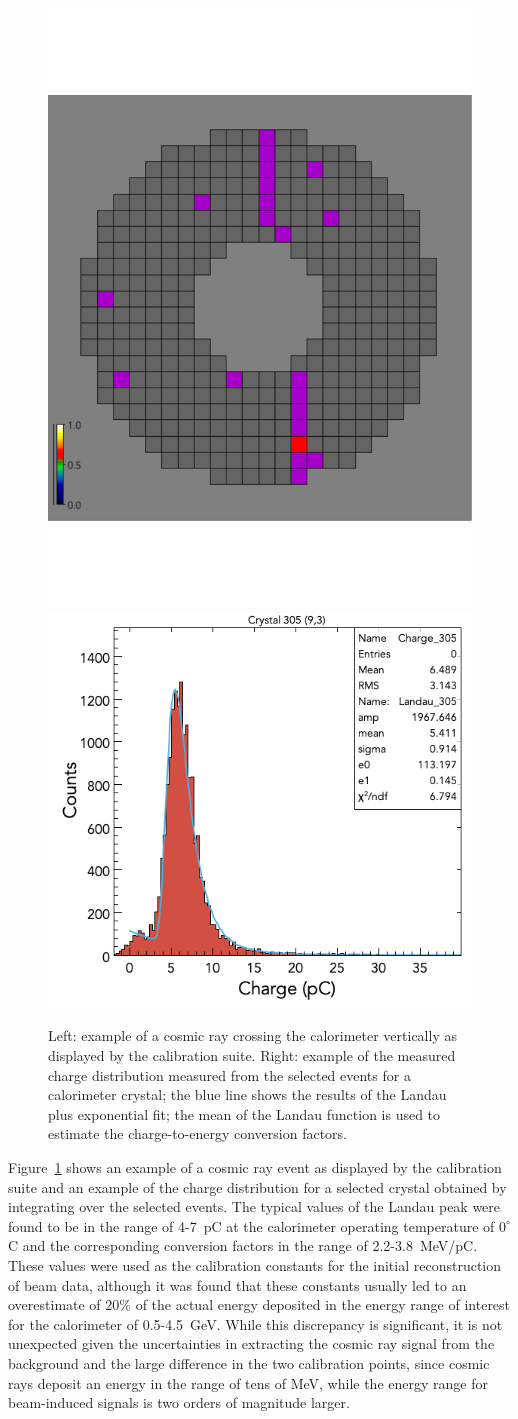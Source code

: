 \begin{figure}
\includegraphics[height=0.58\columnwidth]{fig/ftcal_cosmicview.pdf}
\includegraphics[height=0.5\columnwidth]{fig/ftcal_cosmiccharge.png}
\caption{Left: example of a cosmic ray crossing the calorimeter vertically as displayed by the calibration suite.
  Right: example of the measured charge distribution measured from the selected events for a calorimeter crystal;
  the blue line shows the results of the Landau plus exponential fit; the mean of the Landau function is used to
  estimate the charge-to-energy conversion factors.}
\label{fig:ftcal_cosmic}
\end{figure}

Figure~\ref{fig:ftcal_cosmic} shows an example of a cosmic ray event as displayed by the calibration suite and an
example of the charge distribution for a selected crystal obtained by integrating over the selected events. The
typical values of the Landau peak were found to be in the range of 4-7~pC at the calorimeter operating temperature
of $0^\circ$C and the corresponding conversion factors in the range of 2.2-3.8~MeV/pC. These values were used as
the calibration constants for the initial reconstruction of beam data, although it was found that these constants
usually led to an overestimate of 20\% of the actual energy deposited in the energy range of interest for the
calorimeter of 0.5-4.5~GeV. While this discrepancy is significant, it is not unexpected given the uncertainties in
extracting the cosmic ray signal from the background and the large difference in the two calibration points, since
cosmic rays deposit an energy in the range of tens of MeV, while the energy range for beam-induced signals is two
orders of magnitude larger.

